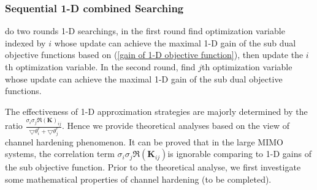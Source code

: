 \documentclass[12pt, draftclsnofoot, onecolumn]{IEEEtran}
\begin{document}
\begin{spacing}{2}
\subsubsection{ Sequential 1-D combined Searching}
do two rounds 1-D searchings, in the first round find optimization variable indexed by $i$ whose update can achieve the maximal 1-D gain of the sub dual objective functions based on (\ref{gain of 1-D objective function}), then update the $i$th optimization variable. In the second round, find $j$th optimization variable whose update can achieve the maximal 1-D gain of the sub dual objective functions.

 The effectiveness of 1-D approximation strategies are majorly determined by the ratio $\frac{\sigma_{i}\sigma_{j}\Re{(\mathbf{K})}_{ij}}{\bigtriangledown \theta^{r}_{i}+\bigtriangledown \theta^{r}_{j}}$. Hence we provide theoretical analyses based on the view of channel hardening phenomenon. It can be proved that in the large MIMO systems, the correlation term $\sigma_{i}\sigma_{j}\Re(\mathbf{K}_{ij})$is ignorable comparing to 1-D gains of the sub objective function. Prior to the theoretical analyse, we first investigate some mathematical properties of channel hardening (to be completed).    










\end{spacing}
\end{document}
